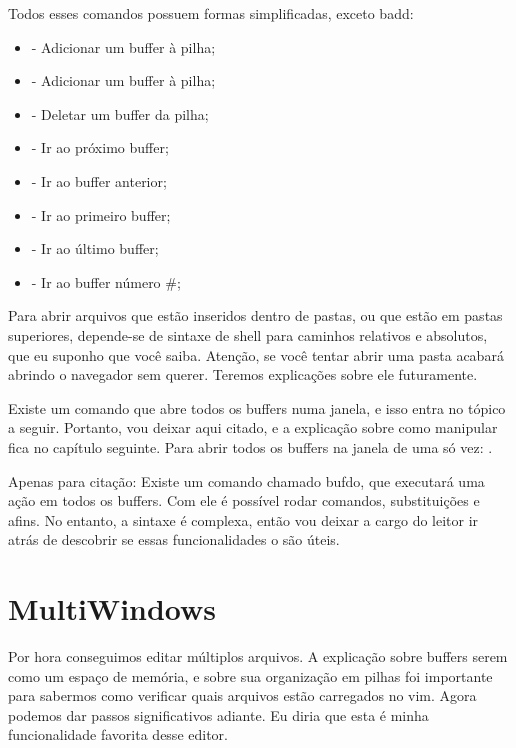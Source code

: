 Todos esses comandos possuem formas simplificadas, exceto badd:
\begin{multicols}{2}
\begin{itemize}
    \item {} - Adicionar um buffer à pilha;
    \item {} - Adicionar um buffer à pilha;
    \item {} - Deletar um buffer da pilha;
    \item {} - Ir ao próximo buffer;
    \item {} - Ir ao buffer anterior;
    \item {} - Ir ao primeiro buffer;
    \item {} - Ir ao último buffer;
    \item {} - Ir ao buffer número \#;
\end{itemize}
\end{multicols}

Para abrir arquivos que estão inseridos dentro de pastas, ou que estão em pastas superiores,
depende-se de sintaxe de shell para caminhos relativos e absolutos, que eu suponho que você saiba.
Atenção, se você tentar abrir uma pasta acabará abrindo o navegador sem querer.
Teremos explicações sobre ele futuramente.

Existe um comando que abre todos os buffers numa janela, e isso entra no tópico a seguir.
Portanto, vou deixar aqui citado, e a explicação sobre como manipular fica no capítulo seguinte.
Para abrir todos os buffers na janela de uma só vez: .


\vspace{1cm}
Apenas para citação: Existe um comando chamado bufdo, que executará uma ação em todos os buffers.
Com ele é possível rodar comandos, substituições e afins.
No entanto, a sintaxe é complexa, então vou deixar a cargo do leitor ir atrás de descobrir
se essas funcionalidades o são úteis.


\section{MultiWindows}
Por hora conseguimos editar múltiplos arquivos.
A explicação sobre buffers serem como um espaço de memória, e sobre sua organização em pilhas
foi importante para sabermos como verificar quais arquivos estão carregados no vim.
Agora podemos dar passos significativos adiante.
Eu diria que esta é minha funcionalidade favorita desse editor.

